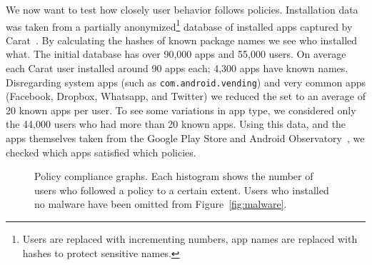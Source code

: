 \documentclass[]{llncs}
\begin{document}
We now want to test how closely user behavior follows policies.
Installation data was taken from a partially anonymized\footnote{Users are replaced with incrementing numbers, app names are replaced with hashes to protect sensitive names.} database of installed apps captured by Carat~\cite{Oliner:2013ht}.
By calculating the hashes of known package names we see who installed what.
The initial database has over 90,000 apps and 55,000 users.
On average each Carat user installed around 90 apps each; 4,300 apps have known names.
Disregarding system apps (such as \texttt{com.android.vending}) and very common apps (Facebook, Dropbox, Whatsapp, and Twitter) we reduced the set to an average of 20 known apps per user.
To see some variations in app type, we considered only the 44,000 users who had more than 20 known apps.
Using this data, and the apps themselves taken from the Google Play Store and Android Observatory~\cite{Barrera:2012iba}, we checked which apps satisfied which policies.

\begin{figure}\centering
    \caption{Policy compliance graphs. Each histogram shows the number of users who followed a policy to a certain extent.  Users who installed no malware have been omitted from Figure~\autoref{fig:malware}.}
\end{figure}
\end{document}
